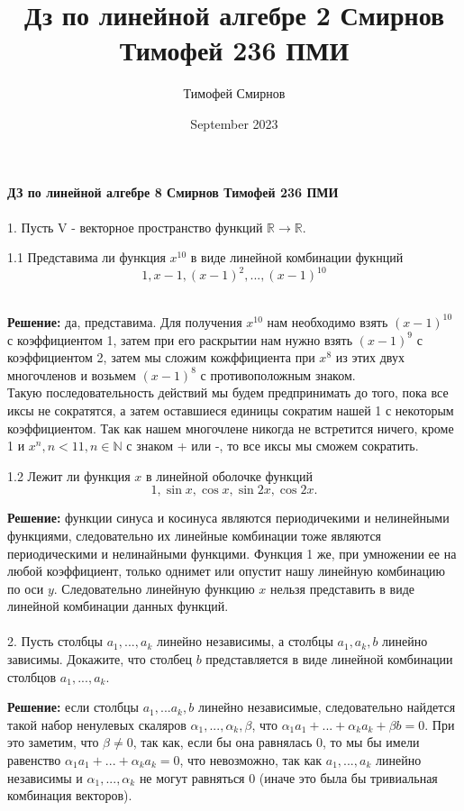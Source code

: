 \documentclass[a4paper, 12pt]{article}
\title{Дз по линейной алгебре 2 Смирнов Тимофей 236 ПМИ}
\author{Тимофей Смирнов}
\date{September 2023}
\begin{document}
    {\center \bf \large ДЗ по линейной алгебре 8 Смирнов Тимофей 236 ПМИ}
    \\
    \\ 1. Пусть V - векторное пространство функций $\mathbb{R} \to \mathbb{R}$.
    \par 1.1 Представима ли функция $x^{10}$ в виде линейной комбинации фукнций
    \[
        1, x - 1, (x - 1)^2, ..., (x - 1)^{10}    
    \]
    \\
    \par \textbf{Решение: } да, представима. Для получения $x^{10}$ нам необходимо взять $(x - 1)^{10}$ с коэффициентом 1, затем при его раскрытии нам нужно взять $(x - 1)^{9}$ с коэффициентом 2, затем мы сложим кожффициента при $x^8$ из этих двух многочленов и возьмем $(x - 1)^{8}$ с противоположным знаком.
    \\ Такую последовательность действий мы будем предпринимать до того, пока все иксы не сократятся, а затем оставшиеся единицы сократим нашей 1 с некоторым коэффициентом. Так как нашем многочлене никогда не встретится ничего, кроме 1 и $x^n, n < 11, n \in \mathbb{N}$ с знаком + или -, то все иксы мы сможем сократить.
    \\
    \par 1.2 Лежит ли функция $x$ в линейной оболочке функций 
    \[ 
        1, \sin x, \cos x, \sin 2x, \cos 2x.
    \]
    \par \textbf{Решение: } функции синуса и косинуса являются периодичекими и нелинейными функциями, следовательно их линейные комбинации тоже являются периодическими и нелинайными функцими. Функция 1 же, при умножении ее на любой коэффициент, только однимет или опустит нашу линейную комбинацию по оси $y$. 
    Следовательно линейную функцию $x$ нельзя представить в виде линейной комбинации данных функций. 
    \\
    \\ 2. Пусть столбцы $a_1, ..., a_k$ линейно независимы, а столбцы $a_1, a_k, b$ линейно зависимы. Докажите, что столбец $b$ представляется в виде линейной комбинации столбцов $a_1, ..., a_k$.
    \\
    \par \textbf{Решение: } если столбцы $a_1, ... a_k, b$ линейно независимые, следовательно найдется такой набор ненулевых скаляров $\alpha_1, ..., \alpha_k, \beta$, что $\alpha_1a_1 + ... + \alpha_ka_k + \beta b = 0$. При это заметим, что $\beta \neq 0$, так как, если бы она равнялась 0, то мы бы имели равенство $\alpha_1a_1 + ... + \alpha_ka_k = 0$, что невозможно, так как $a_1, ..., a_k$ линейно независимы и $\alpha_1, ..., \alpha_k$ не могут равняться 0 (иначе это была бы тривиальная комбинация векторов).
\end{document}
